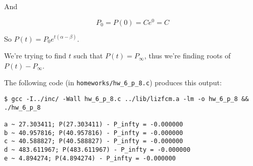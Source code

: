 \documentclass[11pt]{article}
\begin{document}
And

\begin{equation*}
P_0 = P(0) = C e^0 = C
\end{equation*}

So \(P(t) = P_0 e^{t(\alpha - \beta)}\).

We're trying to find \(t\) such that \(P(t) = P_\infty\), thus we're finding roots of \(P(t) - P_\infty\).

The following code (in \texttt{homeworks/hw\_6\_p\_8.c}) produces this output:

\begin{verbatim}
$ gcc -I../inc/ -Wall hw_6_p_8.c ../lib/lizfcm.a -lm -o hw_6_p_8 && ./hw_6_p_8

a ~ 27.303411; P(27.303411) - P_infty = -0.000000
b ~ 40.957816; P(40.957816) - P_infty = -0.000000
c ~ 40.588827; P(40.588827) - P_infty = -0.000000
d ~ 483.611967; P(483.611967) - P_infty = -0.000000
e ~ 4.894274; P(4.894274) - P_infty = -0.000000

\end{verbatim}
\end{document}

